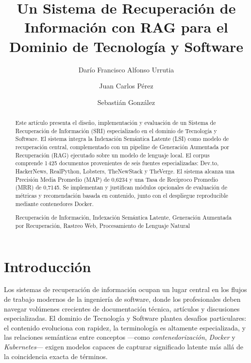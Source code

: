 \documentclass[runningheads,a4paper]{llncs}
\newcommand{\keywords}[1]{\par\addvspace\baselineskip\noindent\keywordname\enspace\ignorespaces#1}
\begin{document}
\mainmatter
\title{Un Sistema de Recuperación de Información con RAG para el Dominio de Tecnología y Software}
\author{Darío Francisco Alfonso Urrutia \and Juan Carlos Pérez \and Sebastián González}
\maketitle
\begin{abstract}
Este artículo presenta el diseño, implementación y evaluación de un Sistema de Recuperación de Información (SRI) especializado en el dominio de Tecnología y Software. El sistema integra la Indexación Semántica Latente (LSI) como modelo de recuperación central, complementado con un pipeline de Generación Aumentada por Recuperación (RAG) ejecutado sobre un modelo de lenguaje local. El corpus comprende 1\,425 documentos provenientes de seis fuentes especializadas: Dev.to, HackerNews, RealPython, Lobsters, TheNewStack y TheVerge. El sistema alcanza una Precisión Media Promedio (MAP) de 0,6234 y una Tasa de Recíproco Promedio (MRR) de 0,7145. Se implementan y justifican módulos opcionales de evaluación de métricas y recomendación basada en contenido, junto con el despliegue reproducible mediante contenedores Docker.
\keywords{Recuperación de Información, Indexación Semántica Latente, Generación Aumentada por Recuperación, Rastreo Web, Procesamiento de Lenguaje Natural}
\end{abstract}

\section{Introducción}

Los sistemas de recuperación de información ocupan un lugar central en los flujos de trabajo modernos de la ingeniería de software, donde los profesionales deben navegar volúmenes crecientes de documentación técnica, artículos y discusiones especializadas. El dominio de Tecnología y Software plantea desafíos particulares: el contenido evoluciona con rapidez, la terminología es altamente especializada, y las relaciones semánticas entre conceptos —como \emph{contenedorización}, \emph{Docker} y \emph{Kubernetes}— exigen modelos capaces de capturar significado latente más allá de la coincidencia exacta de términos.
\end{document}
